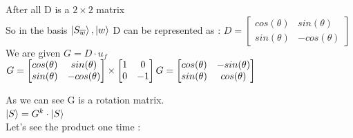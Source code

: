 \documentclass{article}
\begin{document}
After all D is a $2\times2$ matrix \\
So in the basis {$\ket{S_{\overline{w}}},\ket{w}$} D can be represented as : 
\newline \newline
\(D = 
\begin{bmatrix}
cos(\theta) & sin(\theta) \\
sin(\theta) & -cos(\theta)
\end{bmatrix}\)
\newline
We are given $G = D\cdot u_f$
\newline\newline
\(G = 
\begin{bmatrix}
cos(\theta) & sin(\theta) \\
sin(\theta) & -cos(\theta)
\end{bmatrix}
\times
\begin{bmatrix}
1 & 0\\
0 & -1
\end{bmatrix}
\newline \newline
G = 
\begin{bmatrix}
cos(\theta) & -sin(\theta) \\
sin(\theta) & cos(\theta)
\end{bmatrix}\)

As we can see G is a rotation matrix. \\
$\ket{S} = G^k\cdot\ket{S}$\\
Let's see the product one time : 
\end{document}
